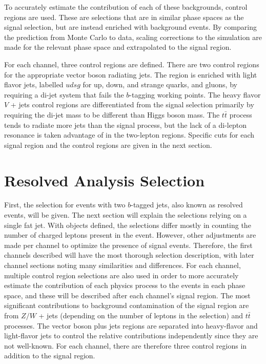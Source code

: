 To accurately estimate the contribution of each of these backgrounds,
control regions are used.
These are selections that are in similar phase spaces as the signal selection,
but are instead enriched with background events.
By comparing the prediction from Monte Carlo to data,
scaling corrections to the simulation are made for the relevant phase space and extrapolated to the signal region.

For each channel, three control regions are defined.
There are two control regions for the appropriate vector boson radiating jets.
The region is enriched with light flavor jets, labelled $udsg$ for
up, down, and strange quarks, and gluons, by requiring a di-jet system that fails
the $b$-tagging working points.
The heavy flavor $V$ + jets control regions are differentiated from the signal selection
primarily by requiring the di-jet mass to be different than Higgs boson mass.
The $t\bar{t}$ process tends to radiate more jets than the signal process,
but the lack of a di-lepton resonance is taken advantage of in the two-lepton regions.
Specific cuts for each signal region and the control regions are given in the next section.

\section{Resolved Analysis Selection}

First, the selection for events with two $b$-tagged jets,
also known as resolved events, will be given.
The next section will explain the selections relying on a single fat jet.
With objects defined, the selections differ mostly in counting the number
of charged leptons present in the event.
However, other adjustments are made per channel to optimize the presence of signal events.
Therefore, the first channels described will have the most thorough selection description,
with later channel sections noting many similarities and differences.
For each channel,
multiple control region selections are also used in order to more accurately
estimate the contribution of each physics process to the events in each phase space,
and these will be described after each channel's signal region.
The most significant contributions to background contamination of the signal region are from
$Z/W$ + jets (depending on the number of leptons in the selection) and $t\bar{t}$ processes.
The vector boson plus jets regions are separated into heavy-flavor and light-flavor jets
to control the relative contributions independently since they are not well-known.
For each channel, there are therefore three control regions in addition to the signal region.

